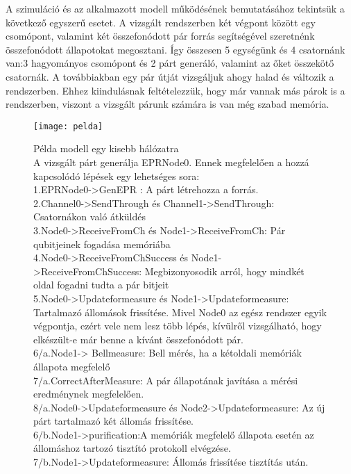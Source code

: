 A szimuláció és az alkalmazott modell működésének bemutatásához tekintsük a következő egyszerű esetet. A vizsgált rendszerben két végpont között egy csomópont, valamint két összefonódott pár forrás segítségével szeretnénk összefonódott állapotokat megosztani. Így összesen 5 egységünk és 4 csatornánk van:3 hagyományos csomópont és 2 párt generáló, valamint az őket összekötő csatornák. A továbbiakban egy pár útját vizsgáljuk ahogy halad és változik a rendszerben. Ehhez kiindulásnak feltételezzük, hogy már vannak más párok is a rendszerben, viszont a vizsgált párunk számára is van még szabad memória.
\\
\begin{figure}
\centering
\texttt{[image: pelda]}
\caption[Példa modell egy kisebb hálózatra]{Példa modell egy kisebb hálózatra\\
A vizsgált párt generálja EPRNode0. Ennek megfelelően a hozzá kapcsolódó lépések egy lehetséges sora: \\
1.EPRNode0->GenEPR : A párt létrehozza a forrás.\\
2.Channel0->SendThrough és Channel1->SendThrough: Csatornákon való átküldés\\
3.Node0->ReceiveFromCh és Node1->ReceiveFromCh: Pár qubitjeinek fogadása memóriába\\
4.Node0->ReceiveFromChSuccess és Node1->ReceiveFromChSuccess: Megbizonyosodik arról, hogy mindkét oldal fogadni tudta a pár bitjeit\\
5.Node0->Updateformeasure és Node1->Updateformeasure: Tartalmazó állomások frissítése. Mivel Node0 az egész rendszer egyik végpontja, ezért vele nem lesz több lépés, kívülről vizsgálható, hogy elkészült-e már benne a kívánt összefonódott pár.\\
6/a.Node1-> Bellmeasure: Bell mérés, ha a kétoldali memóriák állapota megfelelő\\
7/a.CorrectAfterMeasure: A pár állapotának javítása a mérési eredménynek megfelelően.\\
8/a.Node0->Updateformeasure és Node2->Updateformeasure: Az új párt tartalmazó két állomás frissítése.\\
6/b.Node1->purification:A memóriák megfelelő állapota esetén az állomáshoz tartozó tisztító protokoll elvégzése.\\
7/b.Node1->Updateformeasure: Állomás frissítése tisztítás után.
}
\end{figure}
\\
